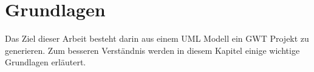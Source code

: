 \chapter{Grundlagen}
\label{Grundlagen}
Das Ziel dieser Arbeit besteht darin aus einem UML Modell ein GWT Projekt zu
generieren. Zum besseren Verständnis werden in diesem Kapitel einige wichtige
Grundlagen erläutert.





